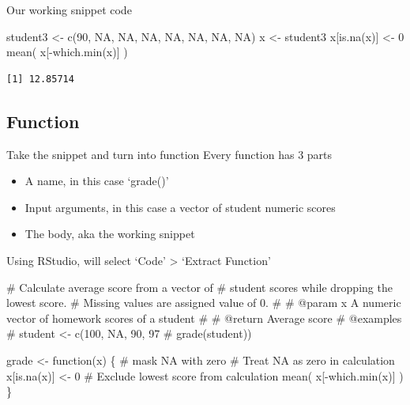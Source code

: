 \documentclass[
  letterpaper,
  DIV=11,
  numbers=noendperiod]{scrartcl}
\newenvironment{Shaded}{\begin{snugshade}}{\end{snugshade}}
\newcommand{\CommentTok}[1]{\textcolor[rgb]{0.37,0.37,0.37}{#1}}
\newcommand{\ConstantTok}[1]{\textcolor[rgb]{0.56,0.35,0.01}{#1}}
\newcommand{\ControlFlowTok}[1]{\textcolor[rgb]{0.00,0.23,0.31}{#1}}
\newcommand{\DecValTok}[1]{\textcolor[rgb]{0.68,0.00,0.00}{#1}}
\newcommand{\FunctionTok}[1]{\textcolor[rgb]{0.28,0.35,0.67}{#1}}
\newcommand{\NormalTok}[1]{\textcolor[rgb]{0.00,0.23,0.31}{#1}}
\newcommand{\OtherTok}[1]{\textcolor[rgb]{0.00,0.23,0.31}{#1}}
\newcommand{\SpecialCharTok}[1]{\textcolor[rgb]{0.37,0.37,0.37}{#1}}
\providecommand{\tightlist}{%
  \setlength{\itemsep}{0pt}\setlength{\parskip}{0pt}}\usepackage{longtable,booktabs,array}
\begin{document}
Our working snippet code

\begin{Shaded}
\begin{Highlighting}[]
\NormalTok{student3 }\OtherTok{\textless{}{-}} \FunctionTok{c}\NormalTok{(}\DecValTok{90}\NormalTok{, }\ConstantTok{NA}\NormalTok{, }\ConstantTok{NA}\NormalTok{, }\ConstantTok{NA}\NormalTok{, }\ConstantTok{NA}\NormalTok{, }\ConstantTok{NA}\NormalTok{, }\ConstantTok{NA}\NormalTok{, }\ConstantTok{NA}\NormalTok{)}
\NormalTok{x }\OtherTok{\textless{}{-}}\NormalTok{ student3}
\NormalTok{x[}\FunctionTok{is.na}\NormalTok{(x)] }\OtherTok{\textless{}{-}} \DecValTok{0}
\FunctionTok{mean}\NormalTok{( x[}\SpecialCharTok{{-}}\FunctionTok{which.min}\NormalTok{(x)] )}
\end{Highlighting}
\end{Shaded}

\begin{verbatim}
[1] 12.85714
\end{verbatim}

\hypertarget{function}{%
\subsection{Function}\label{function}}

Take the snippet and turn into function Every function has 3 parts

\begin{itemize}
\tightlist
\item
  A name, in this case `grade()'
\item
  Input arguments, in this case a vector of student numeric scores
\item
  The body, aka the working snippet
\end{itemize}

Using RStudio, will select `Code' \textgreater{} `Extract Function'

\begin{Shaded}
\begin{Highlighting}[]
\CommentTok{\#\textquotesingle{} Calculate average score from a vector of}
\CommentTok{\#\textquotesingle{} student scores while dropping the lowest score.}
\CommentTok{\#\textquotesingle{} Missing values are assigned value of 0.}
\CommentTok{\#\textquotesingle{}}
\CommentTok{\#\textquotesingle{} @param x A numeric vector of homework scores of a student}
\CommentTok{\#\textquotesingle{}}
\CommentTok{\#\textquotesingle{} @return Average score}
\CommentTok{\#\textquotesingle{} @examples}
\CommentTok{\#\textquotesingle{}  student \textless{}{-} c(100, NA, 90, 97}
\CommentTok{\#\textquotesingle{}  grade(student))}

\NormalTok{grade }\OtherTok{\textless{}{-}} \ControlFlowTok{function}\NormalTok{(x) \{}
  \CommentTok{\# mask NA with zero}
  \CommentTok{\# Treat NA as zero in calculation}
\NormalTok{  x[}\FunctionTok{is.na}\NormalTok{(x)] }\OtherTok{\textless{}{-}} \DecValTok{0}
  \CommentTok{\# Exclude lowest score from calculation}
  \FunctionTok{mean}\NormalTok{( x[}\SpecialCharTok{{-}}\FunctionTok{which.min}\NormalTok{(x)] )}
\NormalTok{\}}
\end{Highlighting}
\end{Shaded}
\end{document}
